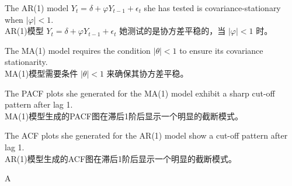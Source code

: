 \documentclass{article}
\begin{document}
    \begin{choices}
        \item The AR(1) model \(Y_t = \delta + \varphi Y_{t-1} + \epsilon_t\) she has tested is covariance-stationary when \(|\varphi| < 1\).\\
        AR(1)模型 \(Y_t = \delta + \varphi Y_{t-1} + \epsilon_t\) 她测试的是协方差平稳的，当 \(|\varphi| < 1\) 时。
        \item The MA(1) model requires the condition \(|\theta| < 1\) to ensure its covariance stationarity.\\
        MA(1)模型需要条件 \(|\theta| < 1\) 来确保其协方差平稳。
        \item The PACF plots she generated for the MA(1) model exhibit a sharp cut-off pattern after lag 1.\\
        MA(1)模型生成的PACF图在滞后1阶后显示一个明显的截断模式。
        \item The ACF plots she generated for the AR(1) model show a cut-off pattern after lag 1.\\
        AR(1)模型生成的ACF图在滞后1阶后显示一个明显的截断模式。
    \end{choices}
    
    \begin{correctanswer}
    A
    \end{correctanswer}
    
\end{document}
